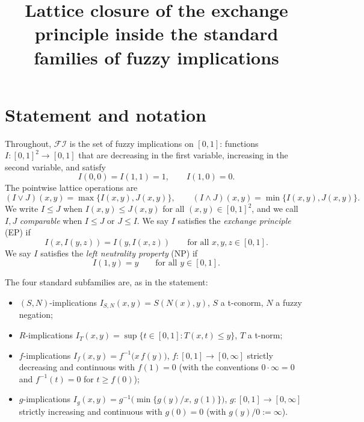 \documentclass{amsart}
\theoremstyle{plain}
\theoremstyle{definition}
\newcommand{\FI}{\mathcal{FI}}
\begin{document}
\title{Lattice closure of the exchange principle inside the standard families of fuzzy implications}
\maketitle

\section{Statement and notation}

Throughout, $\FI$ is the set of fuzzy implications on $[0,1]$: functions
$I\colon[0,1]^2\to[0,1]$ that are decreasing in the first variable, increasing in the
second variable, and satisfy
\begin{equation}\label{eq:bnd}
I(0,0)=I(1,1)=1,\qquad I(1,0)=0 .
\end{equation}
The pointwise lattice operations are
\[
(I\vee J)(x,y)=\max\{I(x,y),J(x,y)\},\qquad
(I\wedge J)(x,y)=\min\{I(x,y),J(x,y)\}.
\]
We write $I\le J$ when $I(x,y)\le J(x,y)$ for all $(x,y)\in[0,1]^2$, and we call $I,J$
\emph{comparable} when $I\le J$ or $J\le I$. We say $I$ satisfies the \emph{exchange
principle} (EP) if
\begin{equation}\label{eq:EP}
I(x,I(y,z))=I(y,I(x,z))\qquad\text{for all }x,y,z\in[0,1].
\end{equation}
We say $I$ satisfies the \emph{left neutrality property} (NP) if
\begin{equation}\label{eq:NP}
I(1,y)=y\qquad\text{for all }y\in[0,1].
\end{equation}

The four standard subfamilies are, as in the statement:
\begin{itemize}
\item $(S,N)$-implications $I_{S,N}(x,y)=S(N(x),y)$, $S$ a t-conorm, $N$ a fuzzy negation;
\item $R$-implications $I_T(x,y)=\sup\{t\in[0,1]:T(x,t)\le y\}$, $T$ a t-norm;
\item $f$-implications $I_f(x,y)=f^{-1}\!\bigl(x\,f(y)\bigr)$, $f\colon[0,1]\to[0,\infty]$
strictly decreasing and continuous with $f(1)=0$ (with the conventions
$0\cdot\infty=0$ and $f^{-1}(t)=0$ for $t\ge f(0)$);
\item $g$-implications $I_g(x,y)=g^{-1}\!\bigl(\min\{g(y)/x,\,g(1)\}\bigr)$,
$g\colon[0,1]\to[0,\infty]$ strictly increasing and continuous with $g(0)=0$
(with $g(y)/0:=\infty$).
\end{itemize}
\end{document}
